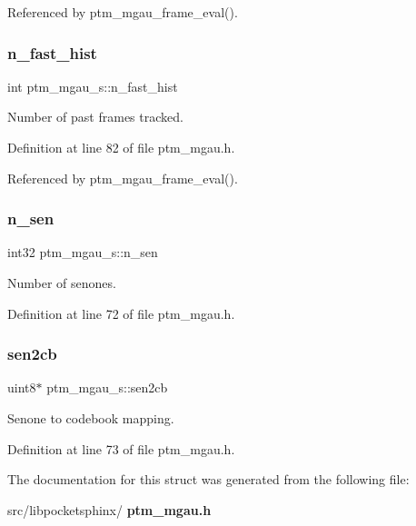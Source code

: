 Referenced by ptm\+\_\+mgau\+\_\+frame\+\_\+eval().

\mbox{\label{structptm__mgau__s_ac491c223199ed5374dfb13fc41854601}} 
\subsubsection{n\+\_\+fast\+\_\+hist}
{\footnotesize\ttfamily int ptm\+\_\+mgau\+\_\+s\+::n\+\_\+fast\+\_\+hist}



Number of past frames tracked. 



Definition at line 82 of file ptm\+\_\+mgau.\+h.



Referenced by ptm\+\_\+mgau\+\_\+frame\+\_\+eval().

\mbox{\label{structptm__mgau__s_ab0f6c452efe082383e906ac2a4f75de4}} 
\subsubsection{n\+\_\+sen}
{\footnotesize\ttfamily int32 ptm\+\_\+mgau\+\_\+s\+::n\+\_\+sen}



Number of senones. 



Definition at line 72 of file ptm\+\_\+mgau.\+h.

\mbox{\label{structptm__mgau__s_a5e677255165b8abda63dd1d6dbed1be7}} 
\subsubsection{sen2cb}
{\footnotesize\ttfamily uint8$\ast$ ptm\+\_\+mgau\+\_\+s\+::sen2cb}



Senone to codebook mapping. 



Definition at line 73 of file ptm\+\_\+mgau.\+h.



The documentation for this struct was generated from the following file\+:\begin{DoxyCompactItemize}
\item 
src/libpocketsphinx/\textbf{ ptm\+\_\+mgau.\+h}\end{DoxyCompactItemize}
